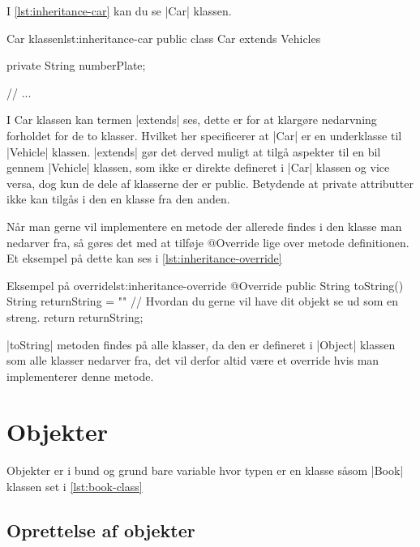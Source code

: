 I \autoref{lst:inheritance-car} kan du se \JavaInline|Car| klassen.

\begin{JavaCode}{Car klassen}{lst:inheritance-car}
	public class Car extends Vehicles {

		private String numberPlate;

		// ...
	}
\end{JavaCode}

I Car klassen kan termen \JavaInline|extends| ses, dette er for at
klargøre nedarvning forholdet for de to klasser. Hvilket her
specificerer at \JavaInline|Car| er en underklasse til
\JavaInline|Vehicle| klassen. \JavaInline|extends| gør det derved
muligt at tilgå aspekter til en bil gennem \JavaInline|Vehicle|
klassen, som ikke er direkte defineret i \JavaInline|Car| klassen og
vice versa, dog kun de dele af klasserne der er public. Betydende at
private attributter ikke kan tilgås i den en klasse fra den anden.

Når man gerne vil implementere en metode der allerede findes i den
klasse man nedarver fra, så gøres det med at tilføje @Override lige
over metode definitionen. Et eksempel på dette kan ses i
\autoref{lst:inheritance-override}

\begin{JavaCode}{Eksempel på override}{lst:inheritance-override}
	@Override
	public String toString() {
		String returnString = ""   // Hvordan du gerne vil have dit objekt se ud som en streng.
		return returnString;
	}
\end{JavaCode}

\JavaInline|toString| metoden findes på alle klasser, da den er
defineret i \JavaInline|Object| klassen som alle klasser nedarver fra,
det vil derfor altid være et override hvis man implementerer denne
metode.






\section{Objekter}

Objekter er i bund og grund bare variable hvor typen er en klasse
såsom \JavaInline|Book| klassen set i \autoref{lst:book-class}

\subsection{Oprettelse af objekter}

